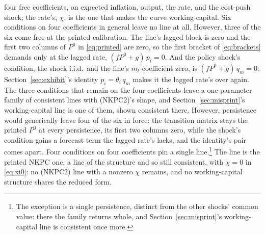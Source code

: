 \documentclass[11pt]{article}
\theoremstyle{remark}
\begin{document}
four free coefficients, on expected inflation, output, the rate, and the cost-push shock; the rate's, $\chi$, is the one that makes the curve working-capital. Six conditions on four coefficients in general leave no line at all. However, three of the six come free at the printed calibration. The line's lagged block is zero and the first two columns of $P^0$ in \eqref{eq:printed} are zero, so the first bracket of \eqref{eq:brackets} demands only at the lagged rate, $(fP^0+g)\,p_i=0$. And the policy shock's condition, the shock i.i.d.\ and the line's $m_t$-coefficient zero, is $(fP^0+g)\,q_m=0$: Section~\ref{sec:exhibit}'s identity $p_i=\theta_i\,q_m$ makes it the lagged rate's over again. The three conditions that remain on the four coefficients leave a one-parameter family of consistent lines with (NKPC2)'s shape, and Section~\ref{sec:misprint}'s working-capital line is one of them, shown consistent there. However, persistence would generically leave four of the six in force: the transition matrix stays the printed $P^0$ at every persistence, its first two columns zero, while the shock's condition gains a forecast term the lagged rate's lacks, and the identity's pair comes apart. Four conditions on four coefficients pin a single line.\footnote{The exception is a single persistence, distinct from the other shocks' common value: there the family returns whole, and Section~\ref{sec:misprint}'s working-capital line is consistent once more.} The line is the printed NKPC one, a line of the structure and so still consistent, with $\chi=0$ in \eqref{eq:xi0}: no (NKPC2) line with a nonzero $\chi$ remains, and no working-capital structure shares the reduced form.
\end{document}
